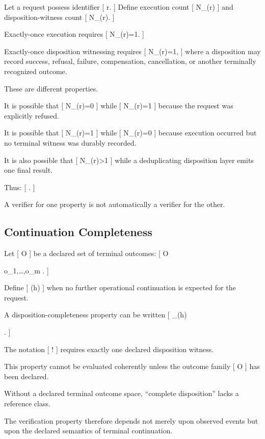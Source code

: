 \documentclass[11pt]{article}
\begin{document}
Let a request possess identifier
[
r.
]
Define execution count
[
N_{}(r)
]
and disposition-witness count
[
N_{}(r).
]

Exactly-once execution requires
[
N_{}(r)=1.
]

Exactly-once disposition witnessing requires
[
N_{}(r)=1,
]
where a disposition may record success, refusal, failure, compensation, cancellation, or another terminally recognized outcome.

These are different properties.

It is possible that
[
N_{}(r)=0
]
while
[
N_{}(r)=1
]
because the request was explicitly refused.

It is possible that
[
N_{}(r)=1
]
while
[
N_{}(r)=0
]
because execution occurred but no terminal witness was durably recorded.

It is also possible that
[
N_{}(r)>1
]
while a deduplicating disposition layer emits one final result.

Thus:
[
\neq
{}.
]

A verifier for one property is not automatically a verifier for the other.

\subsection{Continuation Completeness}

Let
[
\mathcal O
]
be a declared set of terminal outcomes:
[
\mathcal O

{
o_1,\ldots,o_m
}.
]

Define
[
(h)
]
when no further operational continuation is expected for the request.

A disposition-completeness property can be written
[
\Phi_{}(h)

.
]

The notation
[
\exists!
]
requires exactly one declared disposition witness.

This property cannot be evaluated coherently unless the outcome family
[
\mathcal O
]
has been declared.

Without a declared terminal outcome space, ``complete disposition'' lacks a reference class.

The verification property therefore depends not merely upon observed events but upon the declared semantics of terminal continuation.
\end{document}
